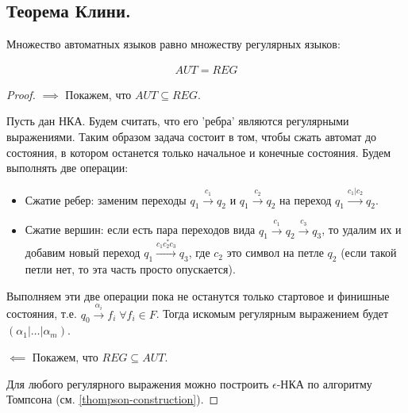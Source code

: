 \subsection{%
  Теорема Клини.%
}

\begin{theorem}
  Множество автоматных языков равно множеству регулярных языков:

  \begin{align*}
    AUT = REG
  \end{align*}
\end{theorem}
\begin{proof}
  \(\implies\) Покажем, что \(AUT \subseteq REG\).
  
  Пусть дан НКА. Будем считать, что его 'ребра' являются регулярными
  выражениями. Таким образом задача состоит в том, чтобы сжать автомат до
  состояния, в котором останется только начальное и конечные состояния.
  Будем выполнять две операции:

  \begin{itemize}
    \item Сжатие ребер: заменим переходы \(q_{1} \xrightarrow{c_{1}} q_{2}\) и
    \(q_{1} \xrightarrow{c_{2}} q_{2}\) на переход
    \(q_{1} \xrightarrow{c_{1} | c_{2}} q_{2}\).

    \item Сжатие вершин: если есть пара переходов вида
    \(q_{1} \xrightarrow{c_{1}} q_{2} \xrightarrow{c_{3}} q_{3}\),
    то удалим их и добавим новый переход
    \(q_{1} \xrightarrow{c_{1} c_{2}^{*} c_{3}} q_{3}\),
    где \(c_{2}\) это символ на петле \(q_{2}\) (если такой петли нет, то эта
    часть просто опускается).
  \end{itemize}

  Выполняем эти две операции пока не останутся только стартовое и финишные
  состояния, т.е.
  \(q_{0} \xrightarrow{\alpha_{i}} f_{i} \; \forall f_{i} \in F\).
  Тогда искомым регулярным выражением будет
  \((\alpha_{1} | \dots | \alpha_{m})\).

  \(\impliedby\) Покажем, что \(REG \subseteq AUT\).
  
  Для любого регулярного выражения можно построить \(\epsilon\)-НКА по алгоритму
  Томпсона (см. \ref{thompson-construction}).
\end{proof}
